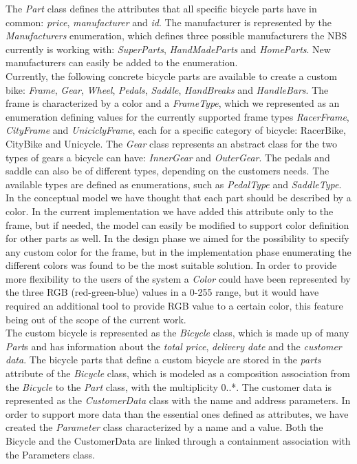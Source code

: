 \noindent The \emph{Part} class defines the attributes that all specific bicycle
parts have in common: \emph{price}, \emph{manufacturer} and \emph{id}. The
manufacturer is represented by the \emph{Manufacturers} enumeration, which
defines three possible manufacturers the NBS currently is working with:
\emph{SuperParts}, \emph{HandMadeParts} and \emph{HomeParts}. New manufacturers
can easily be added to the enumeration.\\

\noindent Currently, the following concrete bicycle parts are available to
create a custom bike: \emph{Frame}, \emph{Gear}, \emph{Wheel}, \emph{Pedals}, \emph{Saddle},
\emph{HandBreaks} and \emph{HandleBars}. The frame is characterized by
a color and a \emph{FrameType}, which we represented as an enumeration defining
values for the currently supported frame types \emph{RacerFrame}, \emph{CityFrame} and
\emph{UniciclyFrame}, each for a specific category of bicycle: RacerBike,
CityBike and Unicycle. The \emph{Gear} class represents an abstract class for
the two types of gears a bicycle can have: \emph{InnerGear} and
\emph{OuterGear}. The pedals and saddle can also be of different types,
depending on the customers needs. The available types are defined as
enumerations, such as \emph{PedalType} and \emph{SaddleType}. \\

\noindent In the conceptual model we have thought that each part should be
described by a color. In the current implementation we have added this attribute only to the frame, but if
needed, the model can easily be modified to support color definition for other parts as well.
In the design phase we aimed for the possibility to specify any custom color for
the frame, but in the implementation phase enumerating the different colors was
found to be the most suitable solution. In order to provide more flexibility to
the users of the system a \emph{Color} could have been represented by the three
RGB (red-green-blue) values in a 0-255 range, but it would have required an
additional tool to provide RGB value to a certain color, this feature being out
of the scope of the current work.\\

\noindent The custom bicycle is represented as the \emph{Bicycle} class, which
is made up of many \emph{Part}s and has information about the \emph{total
price}, \emph{delivery date} and the \emph{customer data}. The bicycle parts
that define a custom bicycle are stored in the \emph{parts} attribute of
the \emph{Bicycle} class, which is modeled as a composition association from the
\emph{Bicycle} to the \emph{Part} class, with the multiplicity 0..*. The customer data is represented as the \emph{CustomerData}
class with the name and address parameters. In order to support more data than
the essential ones defined as attributes, we have created the \emph{Parameter}
class characterized by a name and a value. Both the Bicycle and the CustomerData
are linked through a containment association with the Parameters class.\\


